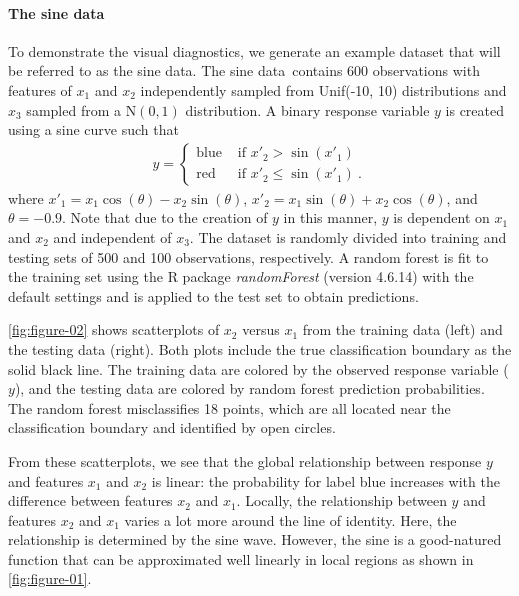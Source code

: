 \documentclass[AMS,STIX2COL]{WileyNJD-v2}\usepackage[]{graphicx}\usepackage[]{color}
\newcommand{\data}{sine data}
\begin{document}
\paragraph{The \data}

To demonstrate the visual diagnostics, we generate an example dataset that will be referred to as the \data. The \data \ contains 600 observations with  features of $x_1$ and $x_2$ independently sampled from Unif(-10, 10) distributions and $x_3$ sampled from a $\mbox{N}(0,1)$ distribution. A binary response variable $y$ is created using a sine curve such that
\begin{eqnarray}\label{eq:data}
  y=\begin{cases}
  \mbox{blue} & \mbox{ if } x'_2 > \sin\left(x'_1\right) \\
  \mbox{red} & \mbox{ if } x'_2 \le \sin\left(x'_1\right) \ .
  \end{cases}
\end{eqnarray}
where $x'_1=x_1\cos(\theta)-x_2\sin(\theta)$,  $x'_2=x_1\sin(\theta)+x_2\cos(\theta)$, and  $\theta=-0.9$. Note that due to the creation of $y$ in this manner, $y$ is dependent on $x_1$ and $x_2$ and independent of $x_3$. The dataset is randomly divided into training and testing sets of 500 and 100 observations, respectively. A random forest is fit to the training set using the R package \emph{randomForest} (version 4.6.14) \citep{liaw:2002} with the default settings and is applied to the test set to obtain predictions. 

\autoref{fig:figure-02} shows scatterplots of $x_2$ versus $x_1$ from the training data (left) and the testing data (right). Both plots include the true classification boundary as the solid black line. The training data are colored by the observed response variable ($y$), and the testing data are colored by random forest prediction probabilities. The random forest misclassifies 18 points, which are all located near the classification boundary and identified by open circles. 

From these scatterplots, we  see that the global relationship between response $y$ and features $x_1$ and $x_2$ is linear: the probability for label blue increases with the difference between features $x_2$ and $x_1$. Locally, the relationship between $y$ and features $x_2$ and $x_1$ varies a lot more around the line of identity. Here, the relationship is determined by the sine wave. However, the sine is a good-natured function that can be approximated well linearly in local regions as shown in \autoref{fig:figure-01}.
\end{document}
